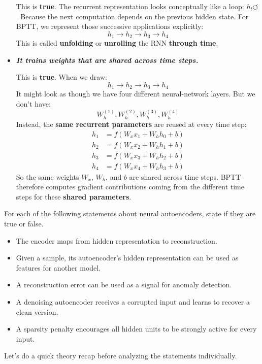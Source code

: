 \begin{itemize}
        This is \textbf{true}. The recurrent representation looks conceptually like a loop: $h_t \circlearrowleft$. Because the next computation depends on the previous hidden state. For BPTT, we represent those successive applications explicitly:
        \begin{equation*}
            h_1 \to h_2 \to h_3 \to h_4
        \end{equation*}
        This is called \textbf{unfolding} or \textbf{unrolling} the RNN \textbf{through time}.

    \item[\textcolor{Green3}{\faIcon{check}}] \textcolor{Green3}{\textbf{\emph{It trains weights that are shared across time steps.}}}

        This is \textbf{true}. When we draw:
        \begin{equation*}
            h_1 \to h_2 \to h_3 \to h_4
        \end{equation*}
        It might look as though we have four different neural-network layers. But we don't have:
        \begin{equation*}
            W_h^{(1)}, W_h^{(2)}, W_h^{(3)}, W_h^{(4)}
        \end{equation*}
        Instead, the \textbf{same recurrent parameters} are reused at every time step:
        \begin{align*}
            h_1 &= f\left(
                W_{x}x_1 + W_{h}h_{0} + b
            \right) \\
            h_2 &= f\left(
                W_{x}x_2 + W_{h}h_{1} + b
            \right) \\
            h_3 &= f\left(
                W_{x}x_3 + W_{h}h_{2} + b
            \right) \\
            h_4 &= f\left(
                W_{x}x_4 + W_{h}h_{3} + b
            \right)
        \end{align*}
        So the same weights $W_x$, $W_h$, and $b$ are shared across time steps. BPTT therefore computes gradient contributions coming from the different time steps for these \textbf{shared parameters}.
\end{itemize}

\newpage

\noindent
\exercise[1] For each of the following statements about neural autoencoders, state if they are true or false.
\begin{itemize}[label=\textbf{T/F.}, leftmargin=2cm]
    \item The encoder maps from hidden representation to reconstruction.
    \item Given a sample, its autoencoder's hidden representation can be used as features for another model.
    \item A reconstruction error can be used as a signal for anomaly detection.
    \item A denoising autoencoder receives a corrupted input and learns to recover a clean version.
    \item A sparsity penalty encourages all hidden units to be strongly active for every input.
\end{itemize}
\solution Let's do a quick theory recap before analyzing the statements individually.

